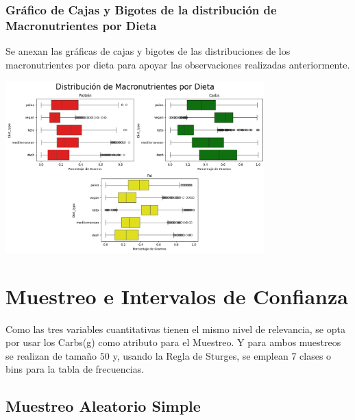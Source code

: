 \documentclass[12pt,a4paper]{article}
\begin{document}
    \subsubsection{Gráfico de Cajas y Bigotes de la distribución de Macronutrientes por Dieta}
        Se anexan las gráficas de cajas y bigotes de las distribuciones de los 
        macronutrientes por dieta para apoyar las observaciones realizadas anteriormente.
        \begin{center}
            \includegraphics[width=0.75\textwidth]{Resources/2_03_plot_06.png}
        \end{center}

\newpage

\section{Muestreo e Intervalos de Confianza}
    Como las tres variables cuantitativas tienen el mismo nivel 
    de relevancia, se opta por usar los Carbs(g) como atributo 
    para el Muestreo. Y para ambos muestreos se realizan de 
    tamaño $50$ y, usando la Regla de Sturges, se emplean 7 clases 
    o bins para la tabla de frecuencias.
    
    \subsection{Muestreo Aleatorio Simple}
        
\end{document}
